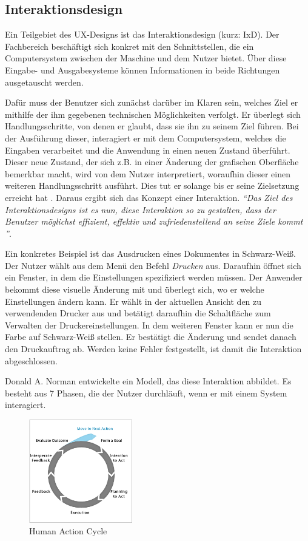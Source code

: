 \subsection{Interaktionsdesign} \label{sec:interactionDesign}
Ein Teilgebiet des UX-Designs ist das Interaktionsdesign (kurz: IxD). Der Fachbereich beschäftigt sich konkret mit den Schnittstellen, die ein Computersystem zwischen der Maschine und dem Nutzer bietet. Über diese Eingabe- und Ausgabesysteme können Informationen in beide Richtungen ausgetauscht werden.\par
Dafür muss der Benutzer sich zunächst darüber im Klaren sein, welches Ziel er mithilfe der ihm gegebenen technischen Möglichkeiten verfolgt. Er überlegt sich Handlungsschritte, von denen er glaubt, dass sie ihn zu seinem Ziel führen. Bei der Ausführung dieser, interagiert er mit dem Computersystem, welches die Eingaben verarbeitet und die Anwendung in einen neuen Zustand überführt. Dieser neue Zustand, der sich z.B. in einer Änderung der grafischen Oberfläche bemerkbar macht, wird von dem Nutzer interpretiert, woraufhin dieser einen weiteren Handlungsschritt ausführt. Dies tut er solange bis er seine Zielsetzung erreicht hat \cite[S. 124]{Moser2012}. Daraus ergibt sich das Konzept einer Interaktion. \textit{\enquote{Das Ziel des Interaktionsdesigns ist es nun, diese Interaktion so zu gestalten, dass der Benutzer möglichst effizient, effektiv und zufriedenstellend an seine Ziele kommt \cite[S. 122]{Moser2012}}}.\par
Ein konkretes Beispiel ist das Ausdrucken eines Dokumentes in Schwarz-Weiß. Der Nutzer wählt aus dem Menü den Befehl \textit{Drucken} aus. Daraufhin öffnet sich ein Fenster, in dem die Einstellungen spezifiziert werden müssen. Der Anwender bekommt diese visuelle Änderung mit und überlegt sich, wo er welche Einstellungen ändern kann. Er wählt in der aktuellen Ansicht den zu verwendenden Drucker aus und betätigt daraufhin die Schaltfläche zum Verwalten der Druckereinstellungen. In dem weiteren Fenster kann er nun die Farbe auf Schwarz-Weiß stellen. Er bestätigt die Änderung und sendet danach den Druckauftrag ab. Werden keine Fehler festgestellt, ist damit die Interaktion abgeschlossen.\par
Donald A. Norman entwickelte ein Modell, das diese Interaktion abbildet. Es besteht aus 7 Phasen, die der Nutzer durchläuft, wenn er mit einem System interagiert. \par
\begin{figure}[H]
 \centering
 \includegraphics[width=0.4\textwidth]{grafiken/action_cycle.png}
 \caption[Human Action Cycle]{Human Action Cycle \cite{Kinser2011}}
 \label{fig:actionCycle}
\end{figure}
